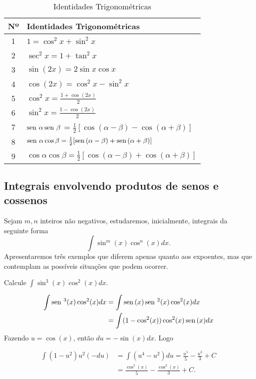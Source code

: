 	\begin{table}[ht]
		\centering
		\begin{tabular}{|c|l|}
			\hline
			\textbf{Nº} & \textbf{Identidades Trigonométricas} \\
			\hline
			1 & $1 = \cos^2 x + \sin^2 x$ \\
			2 & $\sec^2 x = 1 + \tan^2 x $ \\
			3 & $\sin(2x) = 2 \sin x \cos x$ \\
			4 & $\cos(2x) = \cos^2 x - \sin^2 x$ \\
			5 & $\cos^2 x = \frac{1 + \cos(2x)}{2}$ \\
			6 & $\sin^2 x = \frac{1 - \cos(2x)}{2}$ \\
			7 & $\operatorname{sen}\,\alpha\operatorname{sen}\,\beta$ = $\frac{1}{2}[\cos(\alpha-\beta) - \cos(\alpha+\beta)]$ \\
			8 & $\operatorname{sen}\,\alpha
			\cos\beta = \frac{1}{2}[\operatorname{sen}\,(\alpha - \beta) + \operatorname{sen}\,(\alpha + \beta)]$ \\
			9 & $\cos\alpha \cos \beta = \frac{1}{2}[\cos(\alpha - \beta) + \cos(\alpha + \beta)]$\\

			\hline
			
		\end{tabular}
		\caption{Identidades Trigonométricas}
	\end{table}
		
\subsection*{Integrais envolvendo produtos de senos e cossenos}
	
	Sejam $m, n$ inteiros não negativos, estudaremos, inicialmente, integrais da seguinte forma $$ \int \sin^m(x)\cos^n(x)dx.$$
	Apresentaremos três exemplos que diferem apenas quanto aos expoentes, mas que contemplam as possíveis situações que podem ocorrer. 
	
	\begin{ex}
		Calcule $\int \sin^3(x)\cos^2(x)dx$.
		
		\[\begin{split}
			\int \operatorname{sen}\,^3(x)\cos^2(x)dx & = \int \operatorname{sen}\,(x) \operatorname{sen}\,^2(x)\cos^2(x)dx \\
			& = \int (1- \cos^2(x))\cos^2(x)\operatorname{sen}\,(x)dx		
		\end{split}\]
		Fazendo $u =\cos(x)$, então $du = -\sin(x)dx$. Logo
		
		\[\begin{split}
			\int  (1-u^2)u^2(-du) & = \int (u^4 - u^2)du = \frac{u^5}{5} - \frac{u^3}{3} + C \\
			 & = \frac{\cos^5(x)}{5} - \frac{\cos^3(x)}{3} + C.
		\end{split}\]
	\end{ex}
	
